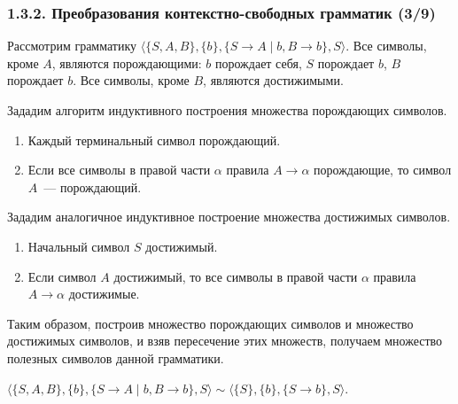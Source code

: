 \documentclass[mathserif,12pt,aspectratio=169]{beamer}
\begin{document}
\begin{frame}
\frametitle{1.3.2. Преобразования контекстно-свободных грамматик (3/9)}

\begin{example}
Рассмотрим грамматику 
$\langle\{S,A,B\}, \{b\}, \{S \rightarrow A\mid b,  B \rightarrow b\},S\rangle$.
Все символы, кроме $A$, являются порождающими: $b$ порождает себя, $S$ порождает $b$, $B$ порождает $b$.
Все символы, кроме $B$, являются достижимыми.
\end{example}

\smallskip
Зададим алгоритм индуктивного построения множества порождающих символов.
\begin{enumerate}
\item Каждый терминальный символ порождающий.
\item Если все символы в правой части $\alpha$ правила 
 $A\rightarrow \alpha$ порождающие, то символ $A$~--- порождающий.
\end{enumerate}

\smallskip
Зададим аналогичное индуктивное построение множества достижимых символов.
\begin{enumerate}
\item Начальный символ $S$ достижимый.
\item Если символ $A$ достижимый, то все символы в правой части $\alpha$ правила 
 $A\rightarrow \alpha$ достижимые.
\end{enumerate}

Таким образом, построив множество порождающих символов и
множество достижимых символов, и взяв пересечение этих множеств, получаем множество полезных символов данной грамматики. 
\begin{example}
$\langle\{S,A,B\}, \{b\}, \{S \rightarrow A\mid b,  B \rightarrow b\},S\rangle
\sim \langle\{S\}, \{b\}, \{S \rightarrow b\},S\rangle$.
\end{example}

\end{frame}
\end{document}
